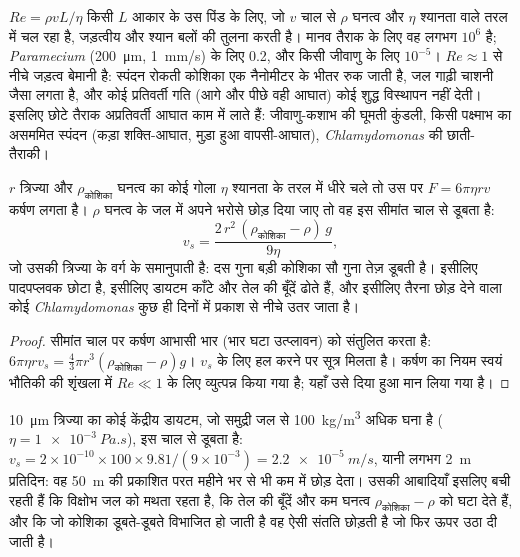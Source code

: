 \begin{proposition}[निम्न रेनॉल्ड्स संख्या पर जीवन]\label{prop:b2:unicellular-diversity:reynolds}
\emph{} $Re = \rho v L/\eta$ किसी $L$ आकार के उस पिंड के
लिए, जो $v$ चाल से $\rho$ घनत्व और $\eta$ श्यानता वाले तरल में चल रहा है,
जड़त्वीय और श्यान बलों की तुलना करती है। मानव तैराक के लिए वह लगभग
$10^6$ है; \emph{Paramecium} (\qty{200}{\micro m},
\qty{1}{mm/s}) के लिए 0.2, और किसी जीवाणु के लिए $10^{-5}$।
$Re \approx 1$ से नीचे जड़त्व बेमानी है: स्पंदन रोकती कोशिका एक
नैनोमीटर के भीतर रुक जाती है, जल गाढ़ी चाशनी जैसा लगता है, और कोई
प्रतिवर्ती गति (आगे और पीछे वही आघात) कोई शुद्ध विस्थापन नहीं देती।
इसलिए छोटे तैराक अप्रतिवर्ती आघात काम में लाते हैं: जीवाणु-कशाभ की घूमती
कुंडली, किसी पक्ष्माभ का असममित स्पंदन (कड़ा शक्ति-आघात, मुड़ा हुआ
वापसी-आघात), \emph{Chlamydomonas} की छाती-तैराकी।
\end{proposition}

\begin{theorem}[स्टोक्स का नियम और डूबना]\label{thm:b2:unicellular-diversity:stokes}
$r$ त्रिज्या और $\rho_{\text{कोशिका}}$ घनत्व का कोई गोला $\eta$ श्यानता के
तरल में धीरे चले तो उस पर $F = 6\pi\eta r v$ कर्षण लगता है। $\rho$
घनत्व के जल में अपने भरोसे छोड़ दिया जाए तो वह इस सीमांत चाल से डूबता
है:
\[
v_s = \frac{2\,r^2\,(\rho_{\text{कोशिका}} - \rho)\,g}{9\eta},
\]
जो उसकी त्रिज्या के वर्ग के समानुपाती है: दस गुना बड़ी कोशिका सौ गुना
तेज़ डूबती है। इसीलिए पादपप्लवक छोटा है, इसीलिए डायटम काँटे और तेल की
बूँदें ढोते हैं, और इसीलिए तैरना छोड़ देने वाला कोई
\emph{Chlamydomonas} कुछ ही दिनों में प्रकाश से नीचे उतर जाता है।
\end{theorem}
\begin{proof}
सीमांत चाल पर कर्षण आभासी भार (भार घटा उत्प्लावन) को संतुलित करता है:
$6\pi\eta r v_s = \tfrac{4}{3}\pi r^3
(\rho_{\text{कोशिका}} - \rho) g$। $v_s$ के लिए हल करने पर सूत्र मिलता है।
कर्षण का नियम स्वयं भौतिकी की शृंखला में $Re \ll 1$ के लिए व्युत्पन्न
किया गया है; यहाँ उसे दिया हुआ मान लिया गया है।
\end{proof}

\begin{example}[किसी डायटम का गिरना]\label{ex:b2:unicellular-diversity:fall}
\qty{10}{\micro m} त्रिज्या का कोई केंद्रीय डायटम, जो समुद्री जल से
\qty{100}{kg/m^3} अधिक घना है ($\eta = \qty{1e-3}{Pa.s}$), इस चाल से
डूबता है: $v_s = 2\times 10^{-10}\times 100\times 9.81/(9\times 10^{-3}) =
\qty{2.2e-5}{m/s}$, यानी लगभग \qty{2}{m} प्रतिदिन: वह \qty{50}{m} की
प्रकाशित परत महीने भर से भी कम में छोड़ देता। उसकी आबादियाँ इसलिए बची
रहती हैं कि विक्षोभ जल को मथता रहता है, कि तेल की बूँदें और कम घनत्व
$\rho_{\text{कोशिका}} - \rho$ को घटा देते हैं, और कि जो कोशिका डूबते-डूबते
विभाजित हो जाती है वह ऐसी संतति छोड़ती है जो फिर ऊपर उठा दी जाती है।
\end{example}

